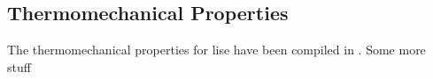 \documentclass[../../../main.tex]{subfiles}
\begin{document}
%
    \subsection{Thermomechanical Properties}%
    \label{sec:lise:thermomechanical-properties}%
    The thermomechanical properties for \gls{lise} have been compiled in .%
Some more stuff

\end{document}
